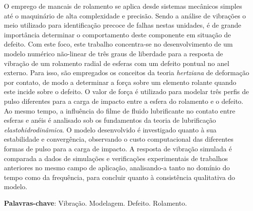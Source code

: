 \imprimircapa
\imprimirfolhaderosto
\clearpage


\begin{agradecimentos}
%	
%	
\end{agradecimentos}

\begin{resumo}
	\SingleSpacing
	O emprego de mancais de rolamento se aplica desde sistemas mecânicos simples até o maquinário de alta complexidade e precisão.
	Sendo a análise de vibrações o meio utilizado para identificação precoce de falhas nestas unidades, é de grande importância determinar o comportamento deste componente em situação de defeito.
	Com este foco, este trabalho concentra-se no desenvolvimento de um modelo numérico não-linear de três graus de liberdade para a resposta de vibração de um rolamento radial de esferas com um defeito pontual no anel externo.
	Para isso, são empregados os conceitos da teoria \emph{hertziana} de deformação por contato, de modo a determinar a força sobre um elemento rolante quando este incide sobre o defeito.
	O valor de força é utilizado para modelar três perfis de pulso diferentes para a carga de impacto entre a esfera do rolamento e o defeito.
	Ao mesmo tempo, a influência do filme de fluido lubrificante no contato entre esferas e anéis é analisado sob os fundamentos da teoria de lubrificação \emph{elastohidrodinâmica}.
	O modelo desenvolvido é investigado quanto à sua estabilidade e convergência, observando o custo computacional das diferentes formas de pulso para a carga de impacto.
	A resposta de vibração simulada é comparada a dados de simulações e verificações experimentais de trabalhos anteriores no mesmo campo de aplicação, analisando-a tanto no domínio do tempo como da frequência, para concluir quanto à consistência qualitativa do modelo.
	\vspace{\onelineskip}
	
	\noindent
	\textbf{Palavras-chave}: Vibração. Modelagem. Defeito. Rolamento.
\end{resumo}

